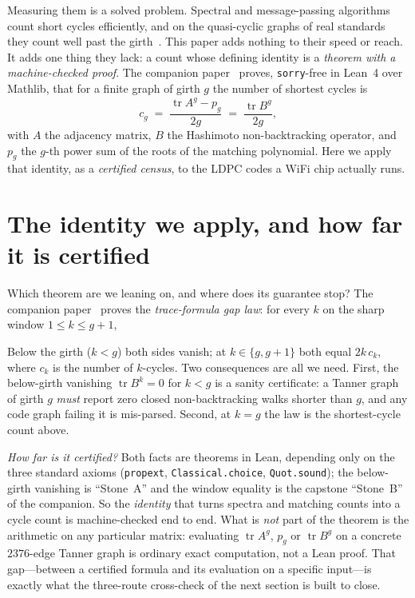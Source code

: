 \documentclass[11pt]{article}
\newcommand{\lean}[1]{\texttt{#1}}
\DeclareMathOperator{\tr}{tr}
\newcommand{\keyeq}[1]{\begin{center}\keybox{$\displaystyle #1$}\end{center}}
\begin{document}
Measuring them is a solved problem. Spectral and message-passing algorithms count short
cycles efficiently, and on the quasi-cyclic graphs of real standards they count well past the
girth~\cite{KarimiBanihashemi2013,BlakeLin2018,Dehghan2018}. This paper adds nothing to their
speed or reach. It adds one thing they lack: a count whose defining identity is a
\emph{theorem with a machine-checked proof}. The companion paper~\cite{MarinGapWindow2026}
proves, \lean{sorry}-free in Lean~4 over Mathlib, that for a finite graph of girth $g$ the
number of shortest cycles is
\[
c_g \;=\; \frac{\tr A^g - p_g}{2g} \;=\; \frac{\tr B^g}{2g},
\]
with $A$ the adjacency matrix, $B$ the Hashimoto non-backtracking operator, and $p_g$ the
$g$-th power sum of the roots of the matching polynomial. Here we apply that identity, as a
\emph{certified census}, to the LDPC codes a WiFi chip actually runs.

\section{The identity we apply, and how far it is certified}
\label{sec:identity}

Which theorem are we leaning on, and where does its guarantee stop? The companion
paper~\cite{MarinGapWindow2026} proves the \emph{trace-formula gap law}: for every $k$ on the
sharp window $1 \le k \le g+1$,
\keyeq{\tr A^k \;-\; p_k \;=\; \tr B^k .}
Below the girth ($k < g$) both sides vanish; at $k \in \{g, g+1\}$ both equal $2k\,c_k$,
where $c_k$ is the number of $k$-cycles. Two consequences are all we need. First, the
below-girth vanishing $\tr B^k = 0$ for $k < g$ is a sanity certificate: a Tanner graph of
girth $g$ \emph{must} report zero closed non-backtracking walks shorter than $g$, and any code
graph failing it is mis-parsed. Second, at $k = g$ the law is the shortest-cycle count above.

\emph{How far is it certified?} Both facts are theorems in Lean, depending only on the three
standard axioms (\lean{propext}, \lean{Classical.choice}, \lean{Quot.sound}); the
below-girth vanishing is ``Stone~A'' and the window equality is the capstone ``Stone~B'' of
the companion. So the \emph{identity} that turns spectra and matching counts into a cycle
count is machine-checked end to end. What is \emph{not} part of the theorem is the arithmetic
on any particular matrix: evaluating $\tr A^g$, $p_g$ or $\tr B^g$ on a concrete $2376$-edge
Tanner graph is ordinary exact computation, not a Lean proof. That gap---between a certified
formula and its evaluation on a specific input---is exactly what the three-route cross-check
of the next section is built to close.
\end{document}
